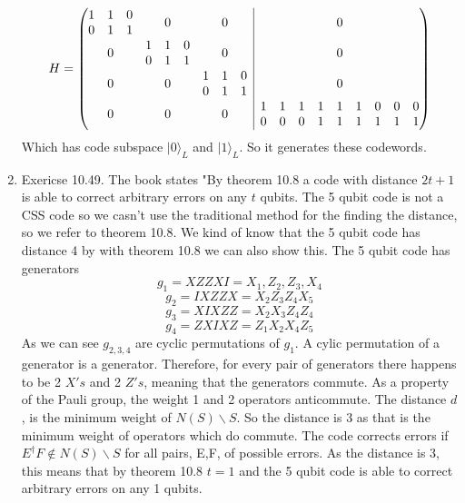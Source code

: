 \documentclass[12pt]{article}
\newcommand{\ket}[1]{\vert{#1}\rangle}
\newcommand{\rvline}{\hspace*{-\arraycolsep}\vline\hspace*{-\arraycolsep}}
\begin{document}
\begin{enumerate}
    $$ H =
        \begin{pmatrix}
          \begin{matrix}
          1 & 1 & 0 \\
          0 & 1 & 1
          \end{matrix}
            & 0 & 0 & \rvline & 0  \\
          0  &
          \begin{matrix}
          1 & 1 &0 \\
          0 & 1& 1
          \end{matrix} & 0 & \rvline &0 \\
          0 & 0 &
          \begin{matrix}
            1 & 1 &0 \\
            0 & 1& 1
            \end{matrix} & \rvline &0   \\
            0 & 0 & 0  & \rvline &
            \begin{matrix}
                1 & 1 &1 &1&1&1&0&0&0 \\
                0&0&0&1&1&1&1&1&1
                \end{matrix} 
          
        \end{pmatrix} $$
    Which has code subspace $\ket{0}_L$ and $\ket{1}_L$. So it generates these codewords. 

    \item Exericse 10.49. The book states "By theorem 10.8 a code with distance $2t +1$ is able to correct arbitrary errors on any $t$ qubits. The 5 qubit code is not a CSS code so we casn't use the traditional method for the finding the distance, so we refer to theorem 10.8. We kind of know that the 5 qubit code has distance 4 by with theorem 10.8 we can also show this. The 5 qubit code has generators 
    $$ g_1 = XZZXI = X_1, Z_2, Z_3, X_4 $$
    $$ g_2 = IXZZX = X_2 Z_3 Z_4 X_5 $$
    $$ g_3 = XIXZZ = X_2 X_3 Z_4 Z_4 $$
    $$ g_4 = ZXIXZ = Z_1 X_2 X_4 Z_5 $$
    As we can see $g_{2,3,4}$ are cyclic permutations of $g_1$. A cylic permutation of a generator is a generator. Therefore, for every pair of generators there happens to be 2 $X's$ and 2 $Z's$, meaning that the generators commute. As a property of the Pauli group, the weight 1 and 2 operators anticommute. The distance $d$, is the minimum weight of $ N(S) \backslash S$. So the distance is 3 as that is the minimum weight of operators which do commute. The code corrects errors if $E^{\dagger} F \notin N(S) \backslash S$ for all pairs, E,F, of possible errors. As the distance is 3, this means that by theorem 10.8 $t=1$ and the 5 qubit code is able to correct arbitrary errors on any 1 qubits. 


\end{enumerate}
\end{document}

